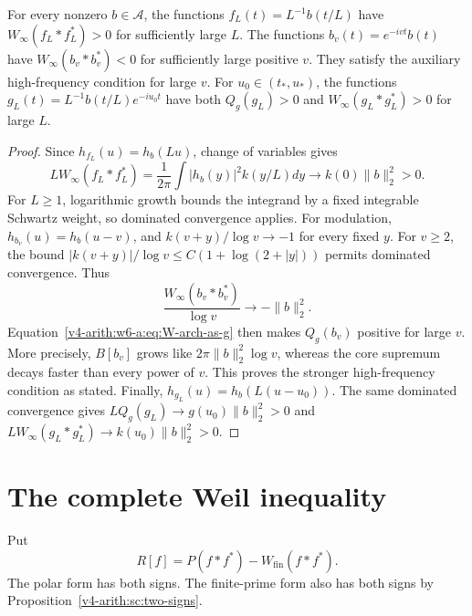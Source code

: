 \begin{theorem}
\label{v4-arith:w6-a:thm:HFD-ATP}
\label{v4-arith:w6-a:rem:HFD-nonempty}
For every nonzero $b\in\mathscr A$, the functions
$f_L(t)=L^{-1}b(t/L)$ have $W_\infty(f_L*f_L^*)>0$ for sufficiently
large $L$. The functions $b_v(t)=e^{-ivt}b(t)$ have
$W_\infty(b_v*b_v^*)<0$ for sufficiently large positive $v$.
They satisfy the auxiliary high-frequency condition for large $v$.
For $u_0\in(t_*,u_*)$, the functions
$g_L(t)=L^{-1}b(t/L)e^{-iu_0t}$ have both
$Q_g(g_L)>0$ and $W_\infty(g_L*g_L^*)>0$ for large $L$.
\end{theorem}
\begin{proof}
Since $h_{f_L}(u)=h_b(Lu)$, change of variables gives
\[
 L W_\infty(f_L*f_L^*)
 =\frac1{2\pi}\int |h_b(y)|^2k(y/L)dy
 \longrightarrow k(0)\|b\|_2^2>0.
\]
For $L\ge1$, logarithmic growth bounds the integrand by a fixed
integrable Schwartz weight, so dominated convergence applies.
For modulation, $h_{b_v}(u)=h_b(u-v)$, and
$k(v+y)/\log v\to-1$ for every fixed $y$.
For $v\ge2$, the bound
$|k(v+y)|/\log v\le C(1+\log(2+|y|))$ permits dominated convergence.
Thus
\[
 \frac{W_\infty(b_v*b_v^*)}{\log v}\longrightarrow-\|b\|_2^2.
\]
Equation~\eqref{v4-arith:w6-a:eq:W-arch-as-g} then makes $Q_g(b_v)$
positive for large $v$. More precisely, $B[b_v]$ grows like
$2\pi\|b\|_2^2\log v$, whereas the core supremum decays faster
than every power of $v$. This proves the stronger high-frequency
condition as stated. Finally,
$h_{g_L}(u)=h_b(L(u-u_0))$. The same dominated convergence gives
$LQ_g(g_L)\to g(u_0)\|b\|_2^2>0$ and
$LW_\infty(g_L*g_L^*)\to k(u_0)\|b\|_2^2>0$.
\end{proof}

\section{The complete Weil inequality}
\label{v4-arith:w6-a:bounded-interval}
\label{v4-arith:w6-a:bounded-interval:ruled-out}

Put
\begin{equation}
 R[f]=P(f*f^*)-W_{\mathrm{fin}}(f*f^*).
 \label{v4-arith:w6-a:eq:R-definition}
\end{equation}
The polar form has both signs. The finite-prime form also has both
signs by Proposition~\ref{v4-arith:sc:two-signs}.

